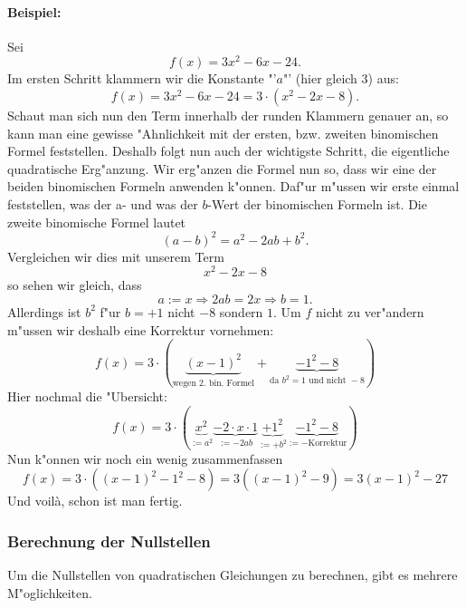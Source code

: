 \paragraph{Beispiel:}
Sei 
\begin{equation*}
f(x) = 3x^2 - 6x - 24.
\end{equation*}
Im ersten Schritt klammern wir die Konstante "'$a$"' (hier gleich $3$) aus:
\begin{equation*}
f(x) = 3x^2 - 6x - 24= 3 \cdot (x^2-2x-8).
\end{equation*}
Schaut man sich nun den Term innerhalb der runden Klammern genauer an, so kann man eine gewisse "Ahnlichkeit mit der ersten, bzw. zweiten binomischen Formel feststellen. Deshalb folgt nun auch der wichtigste Schritt, die eigentliche quadratische Erg"anzung. Wir erg"anzen die Formel nun so, dass wir eine der beiden binomischen Formeln anwenden k"onnen. Daf"ur m"ussen wir erste einmal feststellen, was der a- und was der $b$-Wert der binomischen Formeln ist. Die zweite binomische Formel lautet 
\begin{equation*}
(a-b)^2=a^2-2ab+b^2.
\end{equation*}
Vergleichen wir dies mit unserem Term 
\begin{equation*}
x^2-2x-8
\end{equation*}
so sehen wir gleich, dass
\begin{equation*}
a := x \Rightarrow 2ab = 2x \Rightarrow b = 1.
\end{equation*}
Allerdings ist $b^2$ f"ur $b = +1$ nicht $-8$ sondern $1$. Um $f$ nicht zu ver"andern m"ussen wir deshalb eine Korrektur vornehmen:
\begin{equation*}
f(x) = 3 \cdot \left(  \underbrace{(x-1)^2}_{\text{wegen 2. bin. Formel}} + \underbrace{-1^2 - 8}_{\text{da } b^2 = 1 \text{ und nicht } -8 } \right)
\end{equation*}
Hier nochmal die "Ubersicht:
\begin{equation*}
f(x) = 3 \cdot \left(  \underbrace{x^2}_{:=a^2} \underbrace{- 2 \cdot x \cdot 1}_{:= -2ab} \underbrace{+ 1^2}_{:= + b^2} \underbrace{- 1^2 -8}_{:=-\text{Korrektur}} \right)
\end{equation*} 
Nun k"onnen wir noch ein wenig zusammenfassen
\begin{equation*}
f(x) = 3 \cdot ((x-1)^2-1^2-8) = 3((x-1)^2-9) = 3(x-1)^2-27
\end{equation*}
Und voil\`a, schon ist man fertig.

\subsubsection{Berechnung der Nullstellen} \label{sec:quadnullstellen}
Um die Nullstellen von quadratischen Gleichungen zu berechnen, gibt es mehrere M"oglichkeiten.

